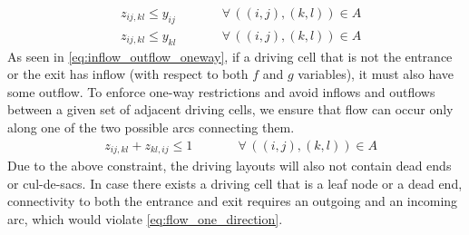 \documentclass[10pt]{article}
\newcommand{\drivevar}[2]{y_{#1#2}}
\newcommand{\countvar}[4]{z_{#1#2,#3#4}}
\newcommand{\gridarcset}{A}
\theoremstyle{definition}
\begin{document}
\begin{align}
& \countvar{i}{j}{k}{l} \leq \drivevar{i}{j}  \qquad && \forall \, ((i,j), (k,l)) \in \gridarcset \label{eq:count_drive1}\\
    & \countvar{i}{j}{k}{l} \leq \drivevar{k}{l}  \qquad && \forall \, ((i,j), (k,l)) \in \gridarcset \label{eq:count_drive2}
\end{align}
As seen in \eqref{eq:inflow_outflow_oneway}, if a driving cell that is not the entrance or the exit has inflow (with respect to both $f$ and $g$ variables), it must also have some outflow. To enforce one-way restrictions and avoid inflows and outflows between a given set of adjacent driving cells, we ensure that flow can occur only along one of the two possible arcs connecting them. 
\begin{align}
& \countvar{i}{j}{k}{l} + \countvar{k}{l}{i}{j} \leq 1 \qquad && \forall \, ((i,j), (k,l)) \in \gridarcset \label{eq:flow_one_direction}
\end{align}
Due to the above constraint, the driving layouts will also not contain dead ends or cul-de-sacs. In case there exists a driving cell that is a leaf node or a dead end, connectivity to both the entrance and exit requires an outgoing and an incoming arc, which would violate \eqref{eq:flow_one_direction}.
\end{document}

